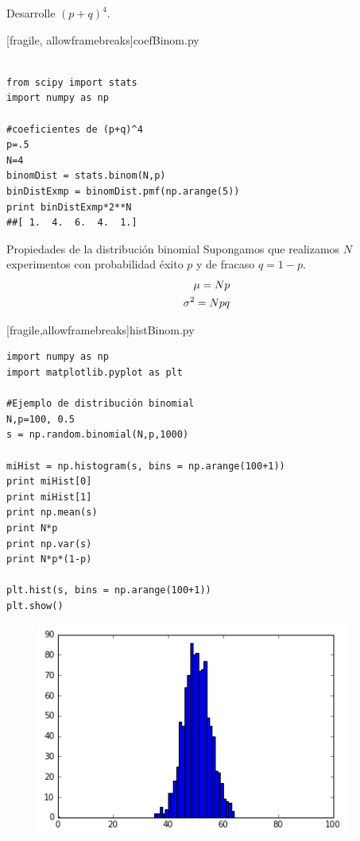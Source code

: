  \begin{ejemplo}
  \label{exmp:7.3}
  Desarrolle $\left( p+q \right)^{4}.$
 \end{ejemplo}


[fragile, allowframebreaks]{coefBinom.py}
\begin{verbatim}

from scipy import stats
import numpy as np

#coeficientes de (p+q)^4
p=.5
N=4
binomDist = stats.binom(N,p)
binDistExmp = binomDist.pmf(np.arange(5))
print binDistExmp*2**N
##[ 1.  4.  6.  4.  1.]
\end{verbatim}


{Propiedades de la distribución binomial} Supongamos que realizamos $N$ experimentos con probabilidad éxito $p$ y de fracaso $q=1-p.$
\begin{align}
 \label{binom:mean}
 \mu = Np \\
 \label{binom:var}
 \sigma^{2}=Npq
\end{align}


[fragile,allowframebreaks]{histBinom.py}
 \begin{verbatim}
import numpy as np
import matplotlib.pyplot as plt

#Ejemplo de distribución binomial
N,p=100, 0.5
s = np.random.binomial(N,p,1000)

miHist = np.histogram(s, bins = np.arange(100+1))
print miHist[0]
print miHist[1]
print np.mean(s)
print N*p
print np.var(s)
print N*p*(1-p)

plt.hist(s, bins = np.arange(100+1))
plt.show()
 \end{verbatim}




 \begin{figure}[h]
 \centering
 \includegraphics[height=7cm,keepaspectratio=true]{./pe/distBin01.png}
 \label{distBin01}
\end{figure}


